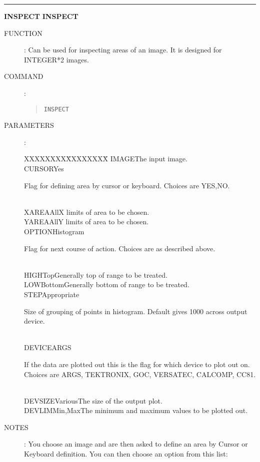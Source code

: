 \goodbreak
\rule{\textwidth}{0.3mm}
{\Large {\bf INSPECT} \hfill {\bf INSPECT}}
\begin{description}
\item [FUNCTION]:
Can be used for inspecting areas of an image.
It is designed for INTEGER*2 images.
\item [COMMAND]:
\begin{quote}
{\tt INSPECT}
\end{quote}
\item [PARAMETERS] :
\begin{tabbing}
XXXXXXXX\=XXXXXXXX\=\kill
IMAGE\>\>The input image.\\
CURSOR\>Yes\>\begin{minipage}[t]{100mm}
Flag for defining area by cursor or keyboard.
Choices are YES,NO.
\end{minipage}\\
XAREA\>All\>X limits of area to be chosen.\\
YAREA\>All\>Y limits of area to be chosen.\\
OPTION\>Histogram\>\begin{minipage}[t]{100mm}
Flag for next course of action.
Choices are as described above.
\end{minipage}\\
HIGH\>Top\>Generally top of range to be treated.\\
LOW\>Bottom\>Generally bottom of range to be treated.\\
STEP\>Appropriate\>\begin{minipage}[t]{100mm}
Size of grouping of points in histogram.
Default gives 1000 across output device.
\end{minipage}\\
DEVICE\>ARGS\>\begin{minipage}[t]{100mm}
If the data are plotted out this is the flag for which device to
plot out on.
Choices are ARGS, TEKTRONIX, GOC, VERSATEC, CALCOMP, CC81.
\end{minipage}\\
DEVSIZE\>Various\>The size of the output plot.\\
DEVLIM\>Min,Max\>The minimum and maximum values to be plotted out.
\end{tabbing}
\item [NOTES]:
You choose an image and are then asked to define an area by Cursor or Keyboard
definition.
You can then choose an option from this list:
\begin{quote}
\begin{tabbing}

\end{tabbing}
\end{quote}
\end{description}
